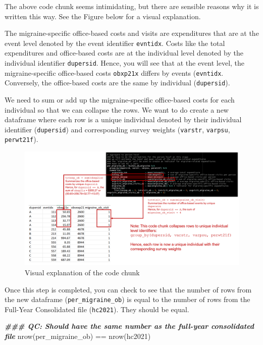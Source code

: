 \documentclass[
]{book}
\newenvironment{Shaded}{\begin{snugshade}}{\end{snugshade}}
\newcommand{\DocumentationTok}[1]{\textcolor[rgb]{0.56,0.35,0.01}{\textbf{\textit{#1}}}}
\newcommand{\FunctionTok}[1]{\textcolor[rgb]{0.00,0.00,0.00}{#1}}
\newcommand{\NormalTok}[1]{#1}
\newcommand{\SpecialCharTok}[1]{\textcolor[rgb]{0.00,0.00,0.00}{#1}}
\begin{document}
The above code chunk seems intimidating, but there are sensible reasons why it is written this way. See the Figure below for a visual explanation.

The migraine-specific office-based costs and visits are expenditures that are at the event level denoted by the event identifier \texttt{evntidx}. Costs like the total expenditures and office-based costs are at the individual level denoted by the individual identifier \texttt{dupersid}. Hence, you will see that at the event level, the migraine-specific office-based costs \texttt{obxp21x} differs by events (\texttt{evntidx}. Conversely, the office-based costs are the same by individual (\texttt{dupersid}).

We need to sum or add up the migraine-specific office-based costs for each individual so that we can collapse the rows. We want to do create a new dataframe where each row is a unique individual denoted by their individual identifier (\texttt{dupersid}) and corresponding survey weights (\texttt{varstr}, \texttt{varpsu}, \texttt{perwt21f}).

\begin{figure}
\includegraphics[width=1\linewidth]{Figure 4_3} \caption{Visual explanation of the code chunk}\label{fig:unnamed-chunk-48}
\end{figure}

Once this step is completed, you can check to see that the number of rows from the new dataframe (\texttt{per\_migraine\_ob}) is equal to the number of rows from the Full-Year Consolidated file (\texttt{hc2021}). They should be equal.

\begin{Shaded}
\begin{Highlighting}[]
\DocumentationTok{\#\#\# QC: Should have the same number as the full{-}year consolidated file}
\FunctionTok{nrow}\NormalTok{(per\_migraine\_ob) }\SpecialCharTok{==} \FunctionTok{nrow}\NormalTok{(hc2021)}
\end{Highlighting}
\end{Shaded}
\end{document}
